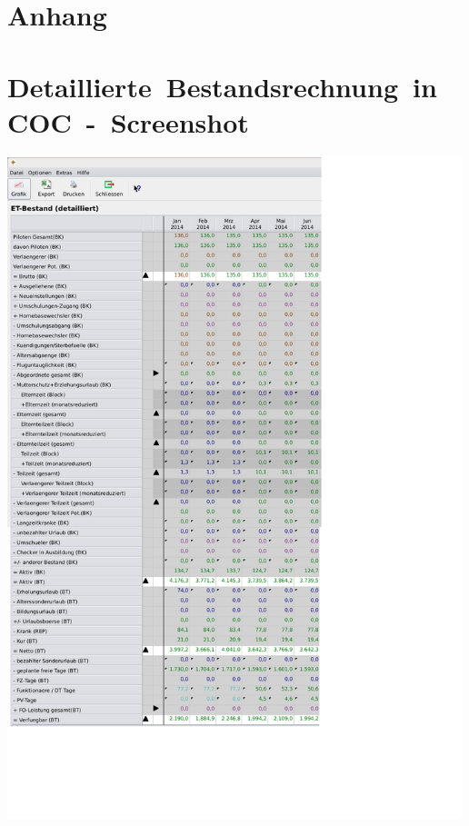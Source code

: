 \documentclass [12pt, a4paper, oneside, titlepage, ngerman]{article}
\begin{document}
\newpage

\setcounter{page}{4}
\section* {Anhang}
\appendix
{}
\section{\mbox{Detaillierte Bestandsrechnung in COC - Screenshot}}
\begin{flushleft}
\includegraphics[width = 500px, keepaspectratio]{Bestand.png}
\end{flushleft}






\newpage
\end{document}
